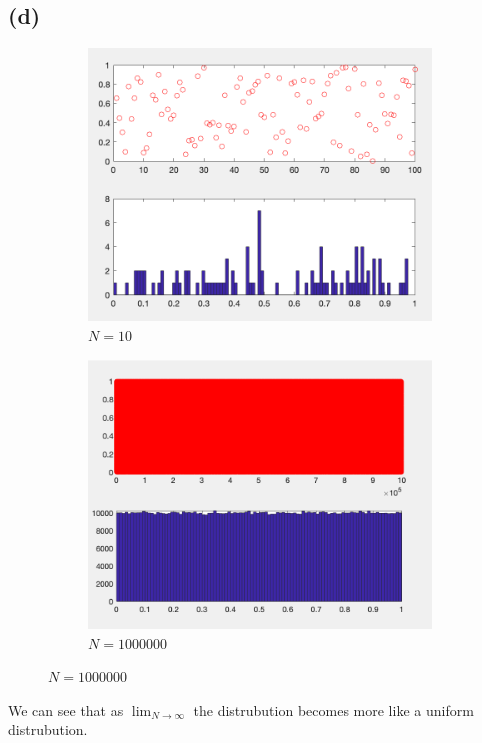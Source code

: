 \documentclass{article}
\begin{document}
\subsection{(d)}
\begin{figure}[H]
    \begin{subfigure}[h]{0.45\linewidth}
        \includegraphics[width=\linewidth]{imgs/q1d_100.png}
        \caption{\( N=10 \)}
    \end{subfigure}
    \hfill
    \begin{subfigure}[h]{0.45\linewidth}
        \includegraphics[width=\linewidth]{imgs/q1d_1000000.png}
        \caption{\( N=1000000\)}
    \end{subfigure}
\end{figure}
We can see that as \( \lim_{N\to \infty}\) the distrubution becomes more like a uniform distrubution. 
\end{document}
